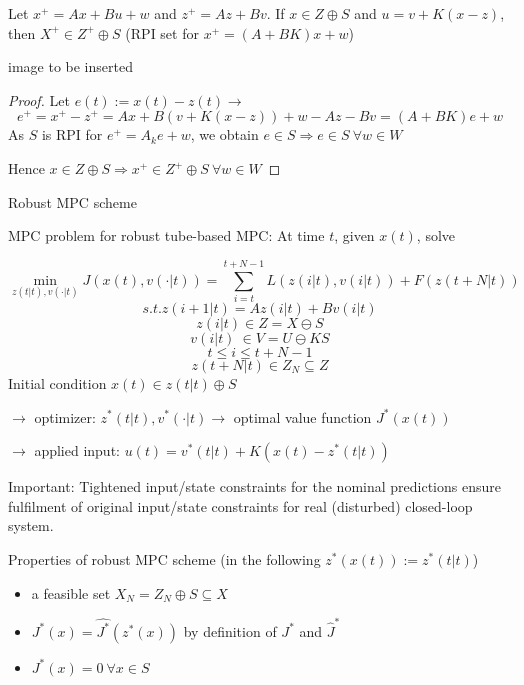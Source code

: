 Let $x^+ = Ax + Bu + w$ and $z^+ = Az + Bv$. If $ x \in Z \oplus S$ and $ u = v + K(x - z)$, then $ X^+ \in Z^+ \oplus S$ (RPI set for $x^+ = (A+BK)x + w$)

image to be inserted

\begin{proof}

Let $e(t) := x(t) - z(t) \rightarrow$
\begin{equation*}
e^+ = x^+ - z^+ = Ax + B(v + K(x-z)) + w - Az - Bv = (A+BK)e + w
\end{equation*}
As $S$ is RPI for $e^+ = A_ke + w$, we obtain $e \in S \Rightarrow e \in S \ \forall w \in W$

Hence $x \in Z \oplus S \Rightarrow x^+ \in Z^+ \oplus S \ \forall w \in W$

\end{proof}

Robust MPC scheme 

MPC problem for robust tube-based MPC: At time $t$, given $x(t)$, solve 

\begin{equation*}
\min_{z(t|t), v(\cdot|t)} J(x(t),v(\cdot|t)) = \sum_{i = t}^{t+ N -1}L(z(i|t), v(i|t)) + F(z(t+N|t))
\end{equation*}
\begin{equation*}
s.t. z(i+1|t) = Az(i|t) + Bv(i|t)
\end{equation*}  
\begin{equation*}
z(i|t) \in Z = X \ominus S 
\end{equation*}
\begin{equation*}
v(i|t) \ \in V = U \ominus KS
\end{equation*}
\begin{equation*}
t \leq i \leq t + N -1
\end{equation*}
\begin{equation*}
z(t+N|t) \in Z_N \subseteq Z 
\end{equation*}
Initial condition $x(t) \in z(t|t) \oplus S$

$\rightarrow$ optimizer: $z^*(t|t), v^*(\cdot|t) \rightarrow$ optimal value function $J^*(x(t))$

$\rightarrow$ applied input: $u(t) = v^*(t|t) + K(x(t) - z^*(t|t))$

Important: Tightened input/state constraints for the nominal predictions ensure fulfilment of original input/state constraints for real (disturbed) closed-loop system.

Properties of robust MPC scheme (in the following $z^*(x(t)):=z^*(t|t)$)
\begin{itemize}
\item a feasible set $X_N = Z_N \oplus S \subseteq X$
\item $J^*(x) = \hat{J^*}(z^*(x))$ by definition of $J^*$ and $\hat J^*$
\item $J^*(x) = 0 \ \forall x \in S$
\end{itemize}    

